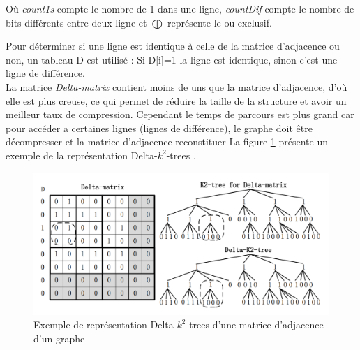 Où \textit{count1s} compte le nombre de 1 dans une ligne, \textit{countDif} compte le nombre de bits différents entre deux ligne et $\bigoplus$ représente le ou exclusif.

Pour déterminer si une ligne est identique à celle de la matrice d'adjacence ou non, un tableau D est utilisé : Si D[i]=1 la ligne est identique, sinon c'est une ligne de différence.\\
La matrice \textit{Delta-matrix} contient moins de uns que la matrice d'adjacence, d'où elle est plus creuse, ce qui permet de réduire la taille de la structure et avoir un meilleur taux de compression. Cependant le temps de parcours est plus grand car pour accéder a certaines lignes (lignes de différence), le graphe doit être décompresser et la matrice d'adjacence reconstituer
La figure \ref{k2-trees-delta} présente un exemple de la représentation Delta-$k^2$-trees \citep{zhang2014delta}.


\begin{figure}[H]
\begin{center}
\includegraphics[height=150 pt, width=380 pt]{./ressources/image/k2-trees-delta.png} 
\end{center}
\caption{Exemple de représentation Delta-$k^2$-trees d'une matrice d'adjacence d'un graphe}
\label{k2-trees-delta}
\end{figure}

